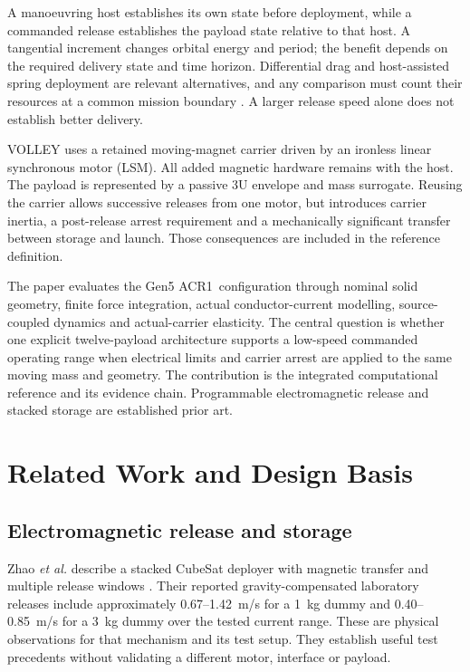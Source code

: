 \documentclass[conference,a4paper]{IEEEtran}
\newcommand{\acr}{Gen5 ACR1}
\begin{document}
A manoeuvring host establishes its own state before deployment, while a commanded release establishes the payload state relative to that host. A tangential increment changes orbital energy and period; the benefit depends on the required delivery state and time horizon. Differential drag and host-assisted spring deployment are relevant alternatives, and any comparison must count their resources at a common mission boundary \cite{foster,vallado}. A larger release speed alone does not establish better delivery.

VOLLEY uses a retained moving-magnet carrier driven by an ironless linear synchronous motor (LSM). All added magnetic hardware remains with the host. The payload is represented by a passive 3U envelope and mass surrogate. Reusing the carrier allows successive releases from one motor, but introduces carrier inertia, a post-release arrest requirement and a mechanically significant transfer between storage and launch. Those consequences are included in the reference definition.

The paper evaluates the \acr\ configuration through nominal solid geometry, finite force integration, actual conductor-current modelling, source-coupled dynamics and actual-carrier elasticity. The central question is whether one explicit twelve-payload architecture supports a low-speed commanded operating range when electrical limits and carrier arrest are applied to the same moving mass and geometry. The contribution is the integrated computational reference and its evidence chain. Programmable electromagnetic release and stacked storage are established prior art.

\section{Related Work and Design Basis}
\subsection{Electromagnetic release and storage}
Zhao \emph{et al.} describe a stacked CubeSat deployer with magnetic transfer and multiple release windows \cite{stacked}. Their reported gravity-compensated laboratory releases include approximately 0.67--1.42~m/s for a 1~kg dummy and 0.40--0.85~m/s for a 3~kg dummy over the tested current range. These are physical observations for that mechanism and its test setup. They establish useful test precedents without validating a different motor, interface or payload.
\end{document}
